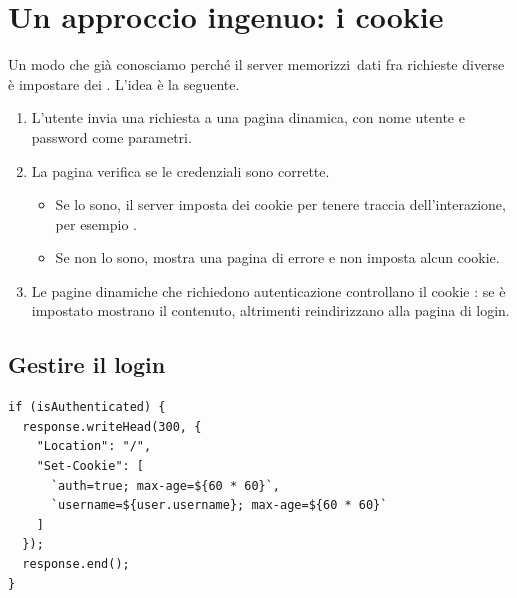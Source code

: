 
\section{Un approccio ingenuo: i cookie}

Un modo che già conosciamo perché il server \guillemotleft memorizzi\guillemotright\ dati fra
richieste diverse è impostare dei . L'idea è la seguente.

\begin{enumerate}
  \item L'utente invia una richiesta a una pagina dinamica, con nome utente e
        password come parametri.
  \item La pagina verifica se le credenziali sono corrette.
    \begin{itemize}
      \item Se lo sono, il server imposta dei cookie per tenere traccia
            dell'interazione, per esempio
            .
      \item Se non lo sono, mostra una pagina di errore e non imposta alcun
            cookie.
    \end{itemize}
  \item Le pagine dinamiche che richiedono autenticazione controllano il cookie
        : se è impostato mostrano il contenuto, altrimenti
        reindirizzano alla pagina di login.
\end{enumerate}

\subsection{Gestire il login}

\begin{lstlisting}[style=js, name=login.js]
if (isAuthenticated) {
  response.writeHead(300, {
    "Location": "/",
    "Set-Cookie": [
      `auth=true; max-age=${60 * 60}`,
      `username=${user.username}; max-age=${60 * 60}`
    ]
  });
  response.end();
}
\end{lstlisting}

